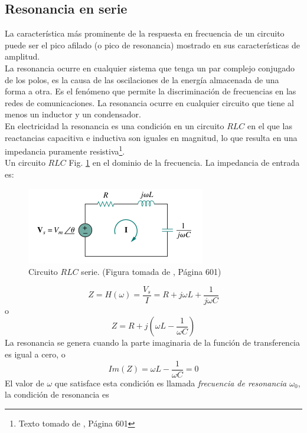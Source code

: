 \documentclass[twocolumn]{IEEEtran}
\begin{document}
\subsection{Resonancia en serie}
\noindent
La característica más prominente de la respuesta en frecuencia de un circuito puede ser el pico afilado (o pico de resonancia) mostrado en sus características de amplitud.\\
La resonancia ocurre en cualquier sistema que tenga un par complejo conjugado de los polos, es la causa de las oscilaciones de la energía almacenada de una forma a otra. Es el fenómeno que permite la discriminación de frecuencias en las redes de comunicaciones. La resonancia ocurre en cualquier circuito que tiene al menos un inductor y un condensador.\\
En electricidad la resonancia es una condición en un circuito $RLC$ en el que las reactancias capacitiva e inductiva son iguales en magnitud, lo que resulta en una impedancia puramente resistiva\footnote{Texto tomado de \cite{sadiku}, Página 601}.\\
Un circuito $RLC$ Fig. \ref{fig2} en el dominio de la frecuencia. La impedancia de entrada es:
\begin{figure}[H]
	\centering
		\includegraphics[scale=0.8]{circuitrlc.png}
	\caption{Circuito $RLC$ serie. (Figura tomada de \cite{sadiku}, Página 601)}
	\label{fig2}
\end{figure}
\begin{equation}
 Z = H(\omega) = \frac{V_s}{I} = R + j \omega L + \frac{1}{j \omega C}
\label{ecu6}
\end{equation}
\noindent o
\begin{equation}
 Z = R + j\left( {\omega L - \frac{1}{{\omega C}}} \right)
\label{ecu7}
\end{equation}
\noindent
La resonancia se genera cuando la parte imaginaria de la función de transferencia es igual a cero, o
\begin{equation}
 Im(Z) = \omega L - \frac{1}{\omega C} = 0
\label{ecu8}
\end{equation}
\noindent
El valor de $\omega$ que satisface esta condición es llamada \textit{frecuencia de resonancia $\omega _{0}$}, la condición de resonancia es
\end{document}
